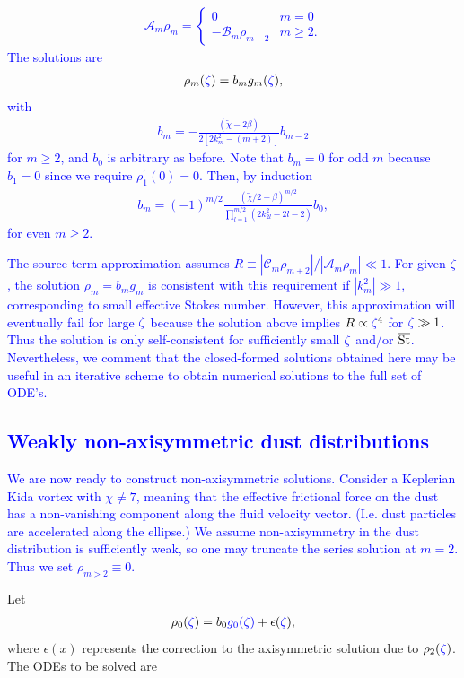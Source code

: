 \documentclass[apj]{emulateapj}
\def\blue#1{\textcolor{blue}{ #1}}
\newcommand{\tilchi}{\tilde\chi}
\newcommand{\St}{{\rm St}}
\begin{document}
\blue{
\begin{align}
\mathcal{A}_m\rho_m = \begin{cases}
        0 & m =0 \\
	-\mathcal{B}_m\rho_{m-2} & m \geq 2.
\end{cases}
\end{align}
The solutions are 
\begin{align}\label{eq:series1}
\rho_m (\blue{\zeta})= b_m g_m(\blue{\zeta}),
\end{align}
with
\begin{align}
b_m  = -\frac{\left(\tilchi - 2\beta\right)}{2\left[2k_m^2 - (m+2)\right]}b_{m-2}
\end{align}
for $m\geq2$, and $b_0$ is arbitrary as before. Note that $b_m=0$ for odd $m$ because $b_1=0$ since 
we require $\rho_1^\prime(0)=0$. Then, by induction 
\begin{align}\label{eq:induction}
b_m  = \left(-1\right)^{m/2}\frac{\left(\tilchi/2-\beta\right)^{m/2}}{\prod_{l=1}^{m/2}
\left(2k_{2l}^2 -2l - 2\right)}b_0,
\end{align}
for even $m\geq 2$.  
}

\blue{
The source term approximation assumes 
$R\equiv|\mathcal{C}_m\rho_{m+2}|/|\mathcal{A}_m\rho_m| \ll 1.$ 
For given $\blue{\zeta}$, the solution $\rho_m=b_mg_m$ is consistent with this requirement if $|k_m^2|\gg1$, corresponding to small effective Stokes number.  
 However, this approximation will eventually fail for large $\blue{\zeta}$ because the solution above implies $R\propto \blue{\zeta}^4$ for $\blue{\zeta}\gg1$. Thus the solution is only self-consistent for sufficiently small $\blue{\zeta}$ and/or $\overline{\St}$. Nevertheless,
we comment that the closed-formed solutions obtained here may be useful in
an iterative scheme to obtain numerical solutions to the full set of ODE's. 
}

\blue{
\subsection{Weakly non-axisymmetric dust distributions}
We are now ready to construct non-axisymmetric solutions. 
Consider a Keplerian Kida vortex with $\chi\neq 7$, meaning that the effective 
frictional force on the dust has a non-vanishing component along the
fluid velocity vector. (I.e. dust particles are accelerated along the
ellipse.) We assume non-axisymmetry in the dust distribution is
sufficiently weak, so one may truncate the series solution at
$m=2$. Thus we set $\rho_{m>2}\equiv0$.} Let
\begin{align}
\rho_0(\blue{\zeta}) = b_0\blue{g_0(\blue{\zeta})} + \epsilon(\blue{\zeta}),
\end{align}
where $\epsilon(x)$ represents the correction to the axisymmetric
solution due to $\rho_2(\blue{\zeta})$. The ODEs to be solved are
\end{document}
